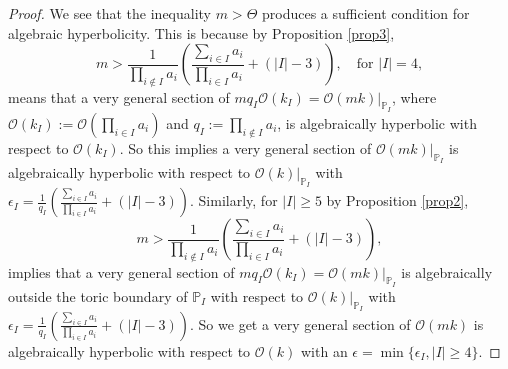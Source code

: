 \documentclass[10pt,a4paper]{amsart}
\begin{document}
\begin{proof}
We see that the inequality $m>\Theta$ produces a sufficient condition for algebraic hyperbolicity. This is because by Proposition \ref{prop3},
\[
m > \frac{1}{\prod_{i\notin I}a_i}(\frac{\sum_{i \in I} a_i}{\prod_{i\in I} a_i} + (|I|-3)), \quad \text{for } |I|=4,
\] 
means that a very general section of $mq_I\mathcal O(k_I)  = \mathcal O(mk)|_{\mathbb{P}_I}$, where $\mathcal O(k_I):= \mathcal O(\prod_{i\in I} a_i)$ and $q_I := \prod_{i \notin I} a_i$, is algebraically hyperbolic with respect to $\mathcal O(k_I)$. So this implies a very general section of $\mathcal O(mk)|_{\mathbb{P}_I}$ is algebraically hyperbolic with respect to $\mathcal O(k)|_{\mathbb{P}_I}$ with $\epsilon_I = \frac 1{q_I}(\frac{\sum_{i \in I} a_i}{\prod_{i\in I} a_i} + (|I|-3))$. Similarly, for $|I|\geq5$ by Proposition \ref{prop2},
\[
m >  \frac{1}{\prod_{i\notin I}a_i}(\frac{\sum_{i \in I} a_i}{\prod_{i\in I} a_i} + (|I|-3)),
\] 
implies that a very general section of $mq_I\mathcal O(k_I)  = \mathcal O(mk)|_{\mathbb{P}_I}$ is algebraically outside the toric boundary of $\mathbb P_I$ with respect to $\mathcal O(k)|_{\mathbb{P}_I}$ with $\epsilon_I = \frac 1{q_I}(\frac{\sum_{i \in I} a_i}{\prod_{i\in I} a_i} + (|I|-3))$. So we get a very general section of $\mathcal O(mk)$ is algebraically hyperbolic with respect to $\mathcal O(k)$ with an $\epsilon = \operatorname{min}\{\epsilon_I, |I|\geq4\}$.
   
\end{proof}
\end{document}
